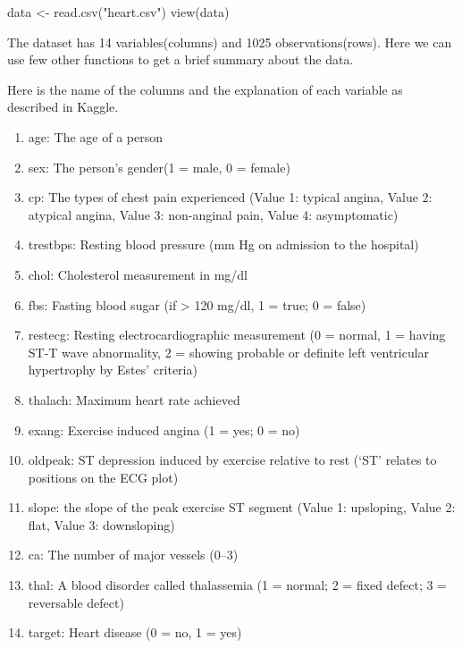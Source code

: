 \documentclass[
]{article}
\newenvironment{Shaded}{\begin{snugshade}}{\end{snugshade}}
\newcommand{\FunctionTok}[1]{\textcolor[rgb]{0.00,0.00,0.00}{#1}}
\newcommand{\NormalTok}[1]{#1}
\newcommand{\OtherTok}[1]{\textcolor[rgb]{0.56,0.35,0.01}{#1}}
\newcommand{\StringTok}[1]{\textcolor[rgb]{0.31,0.60,0.02}{#1}}
\providecommand{\tightlist}{%
  \setlength{\itemsep}{0pt}\setlength{\parskip}{0pt}}
\begin{document}
\begin{Shaded}
\begin{Highlighting}[]
\NormalTok{data }\OtherTok{\textless{}{-}} \FunctionTok{read.csv}\NormalTok{(}\StringTok{"heart.csv"}\NormalTok{)}
\FunctionTok{view}\NormalTok{(data)}
\end{Highlighting}
\end{Shaded}

The dataset has 14 variables(columns) and 1025 observations(rows). Here
we can use few other functions to get a brief summary about the data.

Here is the name of the columns and the explanation of each variable as
described in Kaggle.

\begin{enumerate}
\def\labelenumi{\arabic{enumi}.}
\tightlist
\item
  age: The age of a person\\
\item
  sex: The person's gender(1 = male, 0 = female)\\
\item
  cp: The types of chest pain experienced (Value 1: typical angina,
  Value 2: atypical angina, Value 3: non-anginal pain, Value 4:
  asymptomatic)\\
\item
  trestbps: Resting blood pressure (mm Hg on admission to the
  hospital)\\
\item
  chol: Cholesterol measurement in mg/dl\\
\item
  fbs: Fasting blood sugar (if \textgreater{} 120 mg/dl, 1 = true; 0 =
  false)\\
\item
  restecg: Resting electrocardiographic measurement (0 = normal, 1 =
  having ST-T wave abnormality, 2 = showing probable or definite left
  ventricular hypertrophy by Estes' criteria)\\
\item
  thalach: Maximum heart rate achieved\\
\item
  exang: Exercise induced angina (1 = yes; 0 = no)\\
\item
  oldpeak: ST depression induced by exercise relative to rest (`ST'
  relates to positions on the ECG plot)\\
\item
  slope: the slope of the peak exercise ST segment (Value 1: upsloping,
  Value 2: flat, Value 3: downsloping)\\
\item
  ca: The number of major vessels (0--3)\\
\item
  thal: A blood disorder called thalassemia (1 = normal; 2 = fixed
  defect; 3 = reversable defect)\\
\item
  target: Heart disease (0 = no, 1 = yes)
\end{enumerate}
\end{document}
